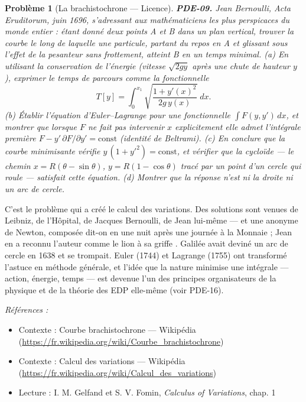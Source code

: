 \documentclass[11pt]{article}
\newtheorem{problem}{Problème}
\newenvironment{refs}{\par\small\noindent\emph{Références :}\begin{itemize}\setlength\itemsep{0pt}}{\end{itemize}\normalsize}
\begin{document}
\begin{problem}[{La brachistochrone --- Licence}]
\textbf{PDE-09.} Jean Bernoulli, \textit{Acta Eruditorum},
juin 1696, s'adressant \og{} aux mathématiciens les plus perspicaces du monde entier \fg{} :
\textit{étant donné deux points A et B dans un plan vertical, trouver la courbe le long de laquelle
une particule, partant du repos en A et glissant sous l'effet de la pesanteur sans frottement,
atteint B en un temps minimal.} (a) En utilisant la conservation de l'énergie (vitesse
$\sqrt{2gy}$ après une chute de hauteur $y$), exprimer le temps de parcours comme la
fonctionnelle
\[ T[y] = \int_0^{x_1} \sqrt{\frac{1 + y'(x)^2}{2g\,y(x)}}\;dx. \]
(b) Établir l'équation d'Euler--Lagrange pour une fonctionnelle $\int F(y,y')\,dx$, et
montrer que lorsque $F$ ne fait pas intervenir $x$ explicitement elle admet l'intégrale
première $F - y'\,\partial F/\partial y' = \text{const}$ (identité de Beltrami).
(c) En conclure que la courbe minimisante vérifie $y\,(1 + y'^2) = \text{const}$,
et vérifier que la cycloïde --- le chemin $x = R(\theta - \sin\theta)$,
$y = R(1 - \cos\theta)$ tracé par un point d'un cercle qui roule --- satisfait cette
équation. (d) Montrer que la réponse n'est ni la droite ni un arc de cercle.
\end{problem}

\noindent C'est le problème qui a créé le calcul des variations.
Des solutions sont venues de Leibniz, de l'Hôpital, de Jacques Bernoulli, de Jean lui-même --- et une
anonyme de Newton, composée dit-on en une nuit après une journée à la Monnaie ;
Jean en a reconnu l'auteur \og{} comme le lion à sa griffe \fg{}. Galilée avait deviné un
arc de cercle en 1638 et se trompait. Euler (1744) et Lagrange (1755) ont transformé
l'astuce en méthode générale, et l'idée que la nature minimise une intégrale ---
action, énergie, temps --- est devenue l'un des principes organisateurs de la physique et de
la théorie des EDP elle-même (voir PDE-16).

\begin{refs}
\item Contexte : Courbe brachistochrone --- Wikipédia (\url{https://fr.wikipedia.org/wiki/Courbe_brachistochrone})
\item Contexte : Calcul des variations --- Wikipédia (\url{https://fr.wikipedia.org/wiki/Calcul_des_variations})
\item Lecture : I. M. Gelfand et S. V. Fomin, \textit{Calculus of Variations}, chap. 1
\end{refs}
\end{document}

